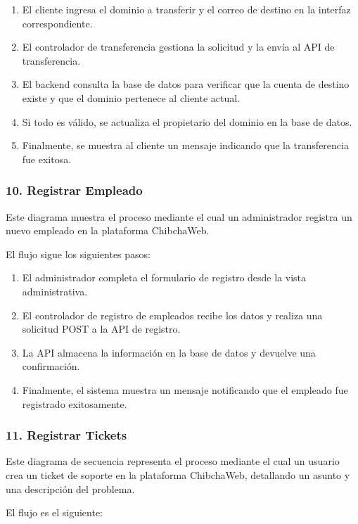 \begin{enumerate}
    \item El cliente ingresa el dominio a transferir y el correo de destino en la interfaz correspondiente.
    \item El controlador de transferencia gestiona la solicitud y la envía al API de transferencia.
    \item El backend consulta la base de datos para verificar que la cuenta de destino existe y que el dominio pertenece al cliente actual.
    \item Si todo es válido, se actualiza el propietario del dominio en la base de datos.
    \item Finalmente, se muestra al cliente un mensaje indicando que la transferencia fue exitosa.
\end{enumerate}

\subsubsection*{10. Registrar Empleado}

 Este diagrama muestra el proceso mediante el cual un administrador registra un nuevo empleado en la plataforma ChibchaWeb.

El flujo sigue los siguientes pasos:

\begin{enumerate}
    \item El administrador completa el formulario de registro desde la vista administrativa.
    \item El controlador de registro de empleados recibe los datos y realiza una solicitud POST a la API de registro.
    \item La API almacena la información en la base de datos y devuelve una confirmación.
    \item Finalmente, el sistema muestra un mensaje notificando que el empleado fue registrado exitosamente.
\end{enumerate}

\subsubsection*{11. Registrar Tickets}

Este diagrama de secuencia representa el proceso mediante el cual un usuario crea un ticket de soporte en la plataforma ChibchaWeb, detallando un asunto y una descripción del problema.

El flujo es el siguiente:

